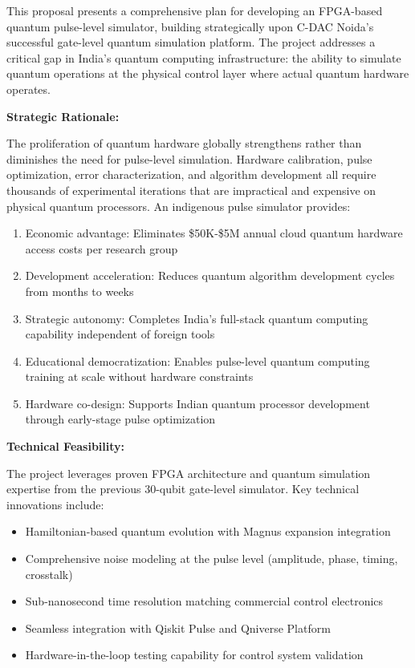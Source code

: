 \documentclass[12pt,a4paper]{article}
\begin{document}
This proposal presents a comprehensive plan for developing an FPGA-based quantum pulse-level simulator, building strategically upon C-DAC Noida's successful gate-level quantum simulation platform. The project addresses a critical gap in India's quantum computing infrastructure: the ability to simulate quantum operations at the physical control layer where actual quantum hardware operates.

\textbf{Strategic Rationale:}

The proliferation of quantum hardware globally strengthens rather than diminishes the need for pulse-level simulation. Hardware calibration, pulse optimization, error characterization, and algorithm development all require thousands of experimental iterations that are impractical and expensive on physical quantum processors. An indigenous pulse simulator provides:

\begin{enumerate}[noitemsep]
\item Economic advantage: Eliminates \$50K-\$5M annual cloud quantum hardware access costs per research group
\item Development acceleration: Reduces quantum algorithm development cycles from months to weeks
\item Strategic autonomy: Completes India's full-stack quantum computing capability independent of foreign tools
\item Educational democratization: Enables pulse-level quantum computing training at scale without hardware constraints
\item Hardware co-design: Supports Indian quantum processor development through early-stage pulse optimization
\end{enumerate}

\textbf{Technical Feasibility:}

The project leverages proven FPGA architecture and quantum simulation expertise from the previous 30-qubit gate-level simulator. Key technical innovations include:

\begin{itemize}[noitemsep]
\item Hamiltonian-based quantum evolution with Magnus expansion integration
\item Comprehensive noise modeling at the pulse level (amplitude, phase, timing, crosstalk)
\item Sub-nanosecond time resolution matching commercial control electronics
\item Seamless integration with Qiskit Pulse and Qniverse Platform
\item Hardware-in-the-loop testing capability for control system validation
\end{itemize}
\end{document}

